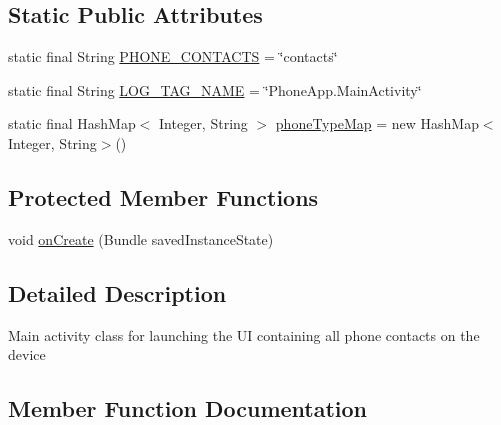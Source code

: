 \subsection*{Static Public Attributes}
\begin{DoxyCompactItemize}
\item 
static final String \hyperlink{classcourse_1_1examples_1_1phoneapp_1_1_main_activity_a60a240e7bcd23f7fa0b2c9e78d19fffb}{P\+H\+O\+N\+E\+\_\+\+C\+O\+N\+T\+A\+C\+T\+S} = \char`\"{}contacts\char`\"{}
\item 
static final String \hyperlink{classcourse_1_1examples_1_1phoneapp_1_1_main_activity_a4c02f85155813ea9b9c5951f21474bea}{L\+O\+G\+\_\+\+T\+A\+G\+\_\+\+N\+A\+M\+E} = \char`\"{}Phone\+App.\+Main\+Activity\char`\"{}
\item 
static final Hash\+Map$<$ Integer, String $>$ \hyperlink{classcourse_1_1examples_1_1phoneapp_1_1_main_activity_a2b0ca4e6cb7439dbf892e504baa83c14}{phone\+Type\+Map} = new Hash\+Map$<$Integer, String$>$()
\end{DoxyCompactItemize}
\subsection*{Protected Member Functions}
\begin{DoxyCompactItemize}
\item 
void \hyperlink{classcourse_1_1examples_1_1phoneapp_1_1_main_activity_a070a6d5a698190ad3ccd4029ef0de81c}{on\+Create} (Bundle saved\+Instance\+State)
\end{DoxyCompactItemize}


\subsection{Detailed Description}
Main activity class for launching the U\+I containing all phone contacts on the device 

\subsection{Member Function Documentation}
\hypertarget{classcourse_1_1examples_1_1phoneapp_1_1_main_activity_a070a6d5a698190ad3ccd4029ef0de81c}{}
